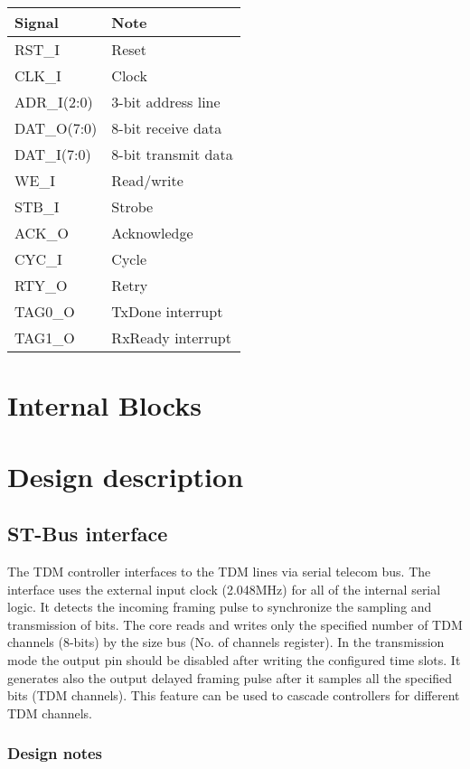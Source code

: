 \documentclass[a4paper,11pt]{article}
\begin{document}
\begin{tabular}{|l|l|}
\hline
Signal& Note\\
\hline
\hline
RST\_I& Reset\\
CLK\_I& Clock\\
ADR\_I(2:0)& 3-bit address line\\
DAT\_O(7:0)& 8-bit receive data\\
DAT\_I(7:0)& 8-bit transmit data\\
WE\_I& Read/write\\
STB\_I& Strobe\\
ACK\_O& Acknowledge\\
CYC\_I& Cycle\\
RTY\_O& Retry\\
TAG0\_O& TxDone interrupt\\
TAG1\_O& RxReady interrupt\\
\hline
\end{tabular}

\section{Internal Blocks}


\section{Design description}


\subsection{ST-Bus interface}
The TDM controller interfaces to the TDM lines via serial telecom bus. The interface uses the external input clock (2.048MHz) for all of the internal serial logic. It detects the incoming framing pulse to synchronize the sampling and transmission of bits. The core reads and writes only the specified number of TDM channels (8-bits) by the size bus (No. of channels register). In the transmission mode the output pin should be disabled after writing the configured time slots. It generates also the output delayed framing pulse after it samples all the specified bits (TDM channels). This feature can be used to cascade controllers for different TDM channels.

\subsubsection{Design notes}
\end{document}
